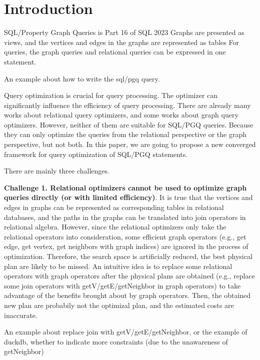 \section{Introduction}

SQL/Property Graph Queries is Part 16 of SQL 2023
Graphs are presented as views, and the vertices and edges in the graphs are represented as tables
For queries, the graph queries and relational queries can be expressed in one statement.

\begin{example}
An example about how to write the sql/pgq query.
\end{example}

Query optimization is crucial for query processing.
The optimizer can significantly influence the efficiency of query processing.
There are already many works about relational query optimizers, and some works about graph query optimizers.
However, neither of them are suitable for SQL/PGQ queries.
Because they can only optimize the queries from the relational perspective or the graph perspective, but not both.
In this paper, we are going to propose a new converged framework for query optimization of SQL/PGQ statements.

There are mainly three challenges.

\textbf{Challenge 1. Relational optimizers cannot be used to optimize graph queries directly (or with limited efficiency)}.
It is true that the vertices and edges in graphs can be represented as corresponding tables in relational databases, and the paths in the graphs can be translated into join operators in relational algebra.
However, since the relational optimizers only take the relational operators into consideration, some efficient graph operators (e.g., get edge, get vertex, get neighbors with graph indices) are ignored in the process of optimization.
Therefore, the search space is artificially reduced, the best physical plan are likely to be missed.
An intuitive idea is to replace some relational operators with graph operators after the physical plans are obtained (e.g., replace some join operators with getV/getE/getNeighbor in graph operators) to take advantage of the benefits brought about by graph operators.
Then, the obtained new plan are probabily not the optimizal plan, and the estimated costs are inaccurate.

\begin{example}
    An example about replace join with getV/getE/getNeighbor,
    or the example of duckdb, whether to indicate more constraints (due to the unawareness of getNeighbor)
\end{example}


